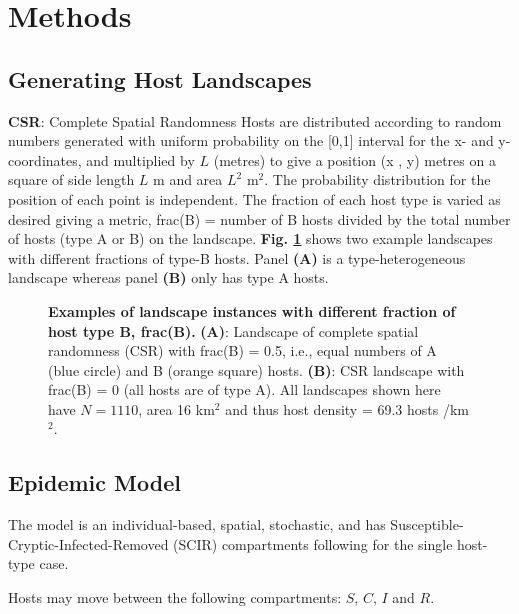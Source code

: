 \documentclass[11pt,letterpaper]{article}
\begin{document}
\FloatBarrier
\section*{Methods}

\subsection*{Generating Host Landscapes}

\textbf{CSR}: Complete Spatial Randomness
\newline
\label{csr}
    Hosts are distributed according to random numbers generated with uniform probability on the [0,1] interval for the x- and y-coordinates, and multiplied by $L$ (metres) to give a position (x , y) metres on a square of side length $L$ m and area $L^2$ m$^2$. The probability distribution for the position of each point is independent. The fraction of each host type is varied as desired giving a metric, frac(B) = number of B hosts divided by the total number of hosts (type A or B) on the landscape.
   \textbf{Fig. \ref{landscapeexample}} shows two example landscapes with different fractions of type-B hosts. Panel \textbf{(A)} is a type-heterogeneous landscape whereas panel \textbf{(B)} only has type A hosts. 
   
\begin{figure} 
	\centering
    
    \caption{   \label{landscapeexample} \textbf{Examples of landscape instances with different fraction of host type B, frac(B).} \newline \textbf{(A)}: Landscape of complete spatial randomness (CSR) with frac(B) = 0.5, i.e.,  equal numbers of A (blue circle) and B (orange square) hosts. \textbf{(B)}:  CSR landscape with frac(B) = 0 (all hosts are of type A). All landscapes shown here have $N = 1110$, area 16 km$^2$ and thus host density = 69.3 hosts /km$^{2}$.}
\end{figure}

\FloatBarrier
\subsection*{Epidemic Model}

The model is an individual-based,  spatial, stochastic, and has Susceptible-Cryptic-Infected-Removed (SCIR) compartments following \cite{HyattTwynam2017} for the single host-type case.

Hosts may move between the following compartments: $S$, $C$, $I$ and $R$.
\end{document}
